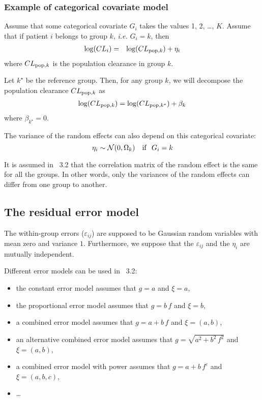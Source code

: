 \subsubsection{Example of categorical covariate model} \label{section_model_catcov}
Assume that some categorical covariate  $G_i$ takes the values 1, 2, \ldots, $K$.
Assume that if patient $i$ belongs to group $k$, {\it i.e.} $G_i=k$, then
\begin{eqnarray*}
\log(CL_i) &=&  \log(CL_{{\rm pop},k}) + \eta_i
\end{eqnarray*}
where $CL_{{\rm pop},k}$ is the population clearance in group $k$.

Let $k^\star$ be the reference group. Then, for any group $k$, we will decompose the population clearance $CL_{{\rm pop},k}$ as
\begin{eqnarray*}
\log(CL_{{\rm pop},k}) = \log(CL_{{\rm pop},k^\star}) + \beta_k
\end{eqnarray*}
where $\beta_{k^\star} = 0$.

The variance of the random effects can also depend on this categorical covariate:
$$ {\eta_i} \sim \mathcal{N}(0, {\Omega}_k) \ \ \ {\rm if } \ \ G_i=k $$

 It is assumed in \monolix~3.2 that the correlation matrix of the random effect is the same for all the groups.
In other words, only the variances of the random effects can  differ from one group to another.


\subsection{The residual error model} \label{section_model_residual}
The within-group errors ($\varepsilon_{ij}$)  are  supposed  to be  Gaussian random variables  with mean  zero and variance $1$.
Furthermore, we suppose that the $\varepsilon_{ij}$ and the $\eta_{i}$ are mutually independent.

Different error models can be used in \monolix~3.2:
\begin{itemize}
\item the constant error model assumes that $g=a$ and $\xi=a$,
\item the proportional error model assumes that $g=b\,f$ and $\xi=b$,
\item a combined error model assumes that $g=a+b\,f$ and $\xi=(a,b)$,
\item an alternative combined error model assumes that $g=\sqrt{a^2+b^2\,f^2}$ and $\xi=(a,b)$,
\item a combined error model with power assumes that $g=a+b\,f^c$ and $\xi=(a,b,c)$,
\item \ldots
\end{itemize}

